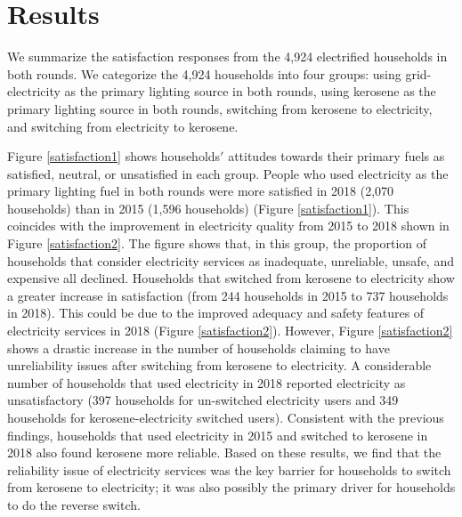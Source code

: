 \documentclass[11pt,english]{article}
\theoremstyle{plain} \newtheorem{claim}{Claim}
\theoremstyle{plain} \newtheorem{prop}{Proposition}
\theoremstyle{plain} \newtheorem{hypo}{Hypothesis}
\begin{document}
\section{Results}

We summarize the satisfaction responses from the 4,924 electrified households in both rounds. We categorize the 4,924 households into four groups: using grid-electricity as the primary lighting source in both rounds, using kerosene as the primary lighting source in both rounds, switching from kerosene to electricity, and switching from electricity to kerosene.

Figure \ref{satisfaction1} shows households$'$ attitudes towards their primary fuels as satisfied, neutral, or unsatisfied in each group. People who used electricity as the primary lighting fuel in both rounds were more satisfied in 2018 (2,070 households) than in 2015 (1,596 households) (Figure \ref{satisfaction1}). This coincides with the improvement in electricity quality from 2015 to 2018 shown in Figure \ref{satisfaction2}. The figure shows that, in this group, the proportion of households that consider electricity services as inadequate, unreliable, unsafe, and expensive all declined. Households that switched from kerosene to electricity show a greater increase in satisfaction (from 244 households in 2015 to 737 households in 2018). This could be due to the improved adequacy and safety features of electricity services in 2018 (Figure \ref{satisfaction2}). However, Figure \ref{satisfaction2} shows a drastic increase in the number of households claiming to have unreliability issues after switching from kerosene to electricity. A considerable number of households that used electricity in 2018 reported electricity as unsatisfactory (397 households for un-switched electricity users and 349 households for kerosene-electricity switched users). Consistent with the previous findings, households that used electricity in 2015 and switched to kerosene in 2018 also found kerosene more reliable. Based on these results, we find that the reliability issue of electricity services was the key barrier for households to switch from kerosene to electricity; it was also possibly the primary driver for households to do the reverse switch.
\end{document}
